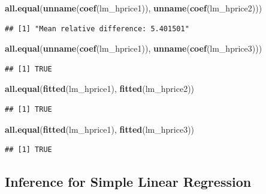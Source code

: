\documentclass[]{book}
\newenvironment{Shaded}{\begin{snugshade}}{\end{snugshade}}
\newcommand{\KeywordTok}[1]{\textcolor[rgb]{0.13,0.29,0.53}{\textbf{#1}}}
\newcommand{\NormalTok}[1]{#1}
\begin{document}
\begin{Shaded}
\begin{Highlighting}[]
\KeywordTok{all.equal}\NormalTok{(}\KeywordTok{unname}\NormalTok{(}\KeywordTok{coef}\NormalTok{(lm_hprice1)), }\KeywordTok{unname}\NormalTok{(}\KeywordTok{coef}\NormalTok{(lm_hprice2)))}
\end{Highlighting}
\end{Shaded}

\begin{verbatim}
## [1] "Mean relative difference: 5.401501"
\end{verbatim}

\begin{Shaded}
\begin{Highlighting}[]
\KeywordTok{all.equal}\NormalTok{(}\KeywordTok{unname}\NormalTok{(}\KeywordTok{coef}\NormalTok{(lm_hprice1)), }\KeywordTok{unname}\NormalTok{(}\KeywordTok{coef}\NormalTok{(lm_hprice3)))}
\end{Highlighting}
\end{Shaded}

\begin{verbatim}
## [1] TRUE
\end{verbatim}

\begin{Shaded}
\begin{Highlighting}[]
\KeywordTok{all.equal}\NormalTok{(}\KeywordTok{fitted}\NormalTok{(lm_hprice1), }\KeywordTok{fitted}\NormalTok{(lm_hprice2))}
\end{Highlighting}
\end{Shaded}

\begin{verbatim}
## [1] TRUE
\end{verbatim}

\begin{Shaded}
\begin{Highlighting}[]
\KeywordTok{all.equal}\NormalTok{(}\KeywordTok{fitted}\NormalTok{(lm_hprice1), }\KeywordTok{fitted}\NormalTok{(lm_hprice3))}
\end{Highlighting}
\end{Shaded}

\begin{verbatim}
## [1] TRUE
\end{verbatim}

\hypertarget{inference-for-simple-linear-regression}{%
\subsection{Inference for Simple Linear
Regression}\label{inference-for-simple-linear-regression}}
\end{document}
